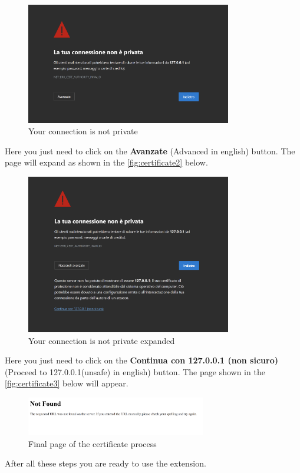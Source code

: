 \begin{figure}[htb]
	\centering
	\includegraphics[width=0.8\textwidth]{images/extension/certificate1.png}
	\caption{Your connection is not private}
	\label{fig:certificate1}
\end{figure}
Here you just need to click on the \textbf{Avanzate} (Advanced in english) button. The page will expand as shown in the \autoref{fig:certificate2} below.
\begin{figure}[htb]
	\centering
	\includegraphics[width=0.8\textwidth]{images/extension/certificate2.png}
	\caption{Your connection is not private expanded}
	\label{fig:certificate2}
\end{figure}
Here you just need to click on the \textbf{Continua con 127.0.0.1 (non sicuro)} (Proceed to 127.0.0.1(unsafe) in english) button. The page shown in the \autoref{fig:certificate3} below will appear.
\begin{figure}[htb]
	\centering
	\includegraphics[width=0.7\textwidth]{images/extension/certificate3.png}
	\caption{Final page of the certificate process}
	\label{fig:certificate3}
\end{figure}
After all these steps you are ready to use the extension.



